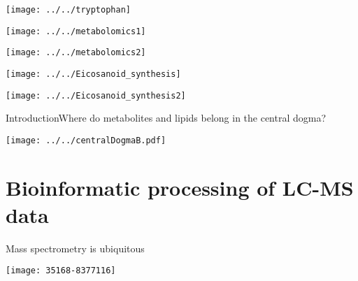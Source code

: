 \documentclass[xcolor=dvipsnames]{beamer}
\begin{document}
\begin{frame}
	\vspace{-10.5pt}
	\begin{center}
		\texttt{[image: ../../tryptophan]}
		
	\end{center}
\end{frame}

\begin{frame}
\begin{center}
	\texttt{[image: ../../metabolomics1]}
\end{center}
\end{frame}

\begin{frame}
\begin{center}
	\texttt{[image: ../../metabolomics2]}
\end{center}
\end{frame}

\begin{frame}
	\begin{center}
		\texttt{[image: ../../Eicosanoid\_synthesis]}
		
	\end{center}
\end{frame}

\begin{frame}
\begin{center}
	\texttt{[image: ../../Eicosanoid\_synthesis2]}
\end{center}
\end{frame}

\begin{frame}{Introduction}{Where do metabolites and lipids belong in the central dogma?}
\vspace{-7 pt}
\begin{center}
	\texttt{[image: ../../centralDogmaB.pdf]}
\end{center}
\end{frame}

\section{Bioinformatic processing of LC-MS data}
\begin{frame}{Mass spectrometry is ubiquitous}
	\vspace{-15pt}
\begin{center}
	\texttt{[image: 35168-8377116]}
\end{center}
\end{frame}
\end{document}
